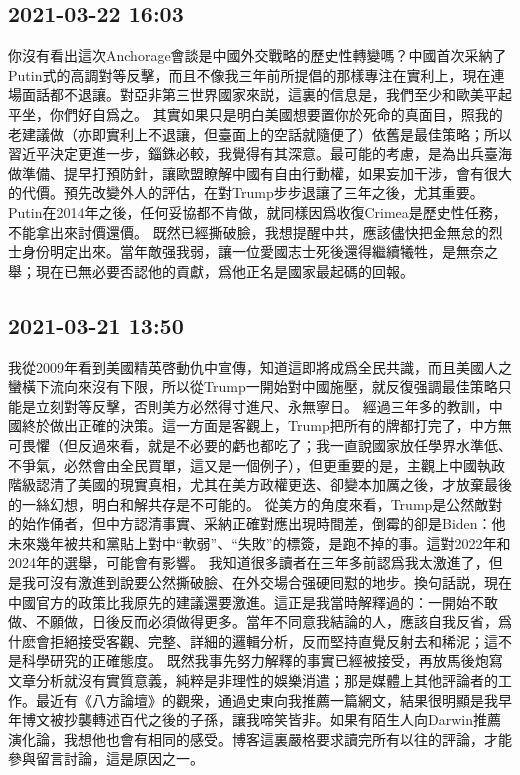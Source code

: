 \documentclass[twocolumn]{ctexart}
\begin{document}
\subsection*{2021-03-22 16:03}

你沒有看出這次Anchorage會談是中國外交戰略的歷史性轉變嗎？中國首次采納了Putin式的高調對等反擊，而且不像我三年前所提倡的那樣專注在實利上，現在連場面話都不退讓。對亞非第三世界國家來説，這裏的信息是，我們至少和歐美平起平坐，你們好自爲之。
其實如果只是明白美國想要置你於死命的真面目，照我的老建議做（亦即實利上不退讓，但臺面上的空話就隨便了）依舊是最佳策略；所以習近平決定更進一步，錙銖必較，我覺得有其深意。最可能的考慮，是為出兵臺海做準備、提早打預防針，讓歐盟瞭解中國有自由行動權，如果妄加干涉，會有很大的代價。預先改變外人的評估，在對Trump步步退讓了三年之後，尤其重要。Putin在2014年之後，任何妥協都不肯做，就同樣因爲收復Crimea是歷史性任務，不能拿出來討價還價。
既然已經撕破臉，我想提醒中共，應該儘快把金無怠的烈士身份明定出來。當年敵强我弱，讓一位愛國志士死後還得繼續犧牲，是無奈之舉；現在已無必要否認他的貢獻，爲他正名是國家最起碼的回報。
\subsection*{2021-03-21 13:50}

我從2009年看到美國精英啓動仇中宣傳，知道這即將成爲全民共識，而且美國人之蠻橫下流向來沒有下限，所以從Trump一開始對中國施壓，就反復强調最佳策略只能是立刻對等反擊，否則美方必然得寸進尺、永無寧日。
經過三年多的教訓，中國終於做出正確的決策。這一方面是客觀上，Trump把所有的牌都打完了，中方無可畏懼（但反過來看，就是不必要的虧也都吃了；我一直說國家放任學界水準低、不爭氣，必然會由全民買單，這又是一個例子），但更重要的是，主觀上中國執政階級認清了美國的現實真相，尤其在美方政權更迭、卻變本加厲之後，才放棄最後的一絲幻想，明白和解共存是不可能的。
從美方的角度來看，Trump是公然敵對的始作俑者，但中方認清事實、采納正確對應出現時間差，倒霉的卻是Biden：他未來幾年被共和黨貼上對中“軟弱”、“失敗”的標簽，是跑不掉的事。這對2022年和2024年的選舉，可能會有影響。
我知道很多讀者在三年多前認爲我太激進了，但是我可沒有激進到說要公然撕破臉、在外交場合强硬囘懟的地步。換句話説，現在中國官方的政策比我原先的建議還要激進。這正是我當時解釋過的：一開始不敢做、不願做，日後反而必須做得更多。當年不同意我結論的人，應該自我反省，爲什麽會拒絕接受客觀、完整、詳細的邏輯分析，反而堅持直覺反射去和稀泥；這不是科學研究的正確態度。
既然我事先努力解釋的事實已經被接受，再放馬後炮寫文章分析就沒有實質意義，純粹是非理性的娛樂消遣；那是媒體上其他評論者的工作。最近有《八方論壇》的觀衆，通過史東向我推薦一篇網文，結果很明顯是我早年博文被抄襲轉述百代之後的子孫，讓我啼笑皆非。如果有陌生人向Darwin推薦演化論，我想他也會有相同的感受。博客這裏嚴格要求讀完所有以往的評論，才能參與留言討論，這是原因之一。
\end{document}
